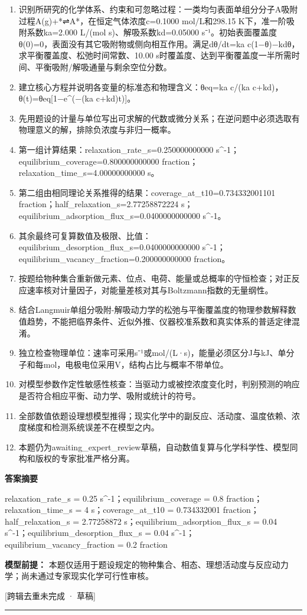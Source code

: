 \documentclass[UTF8,11pt,a4paper]{ctexart}
\begin{document}
\begin{enumerate}
\item 识别所研究的化学体系、约束和可忽略过程：一类均匀表面单组分分子A吸附过程A(g)+*⇌A*，在恒定气体浓度c=0.1000 mol/L和298.15 K下，准一阶吸附系数ka=2.000 L/(mol s)、解吸系数kd=0.05000 s⁻¹。初始表面覆盖度θ(0)=0，表面没有其它吸附物或侧向相互作用。满足dθ/dt=ka c(1−θ)−kdθ，求平衡覆盖度、松弛时间常数、10.00 s时覆盖度、达到平衡覆盖度一半所需时间、平衡吸附/解吸通量与剩余空位分数。
\item 建立核心方程并说明各变量的标准态和物理含义：θeq=ka c/(ka c+kd)，θ(t)=θeq[1−e\textasciicircum{}(−(ka c+kd)t)]。
\item 先用题设的计量与单位写出可求解的代数或微分关系；在逆问题中必须选取有物理意义的解，排除负浓度与非归一概率。
\item 第一组计算结果：relaxation\_rate\_s=0.250000000000 s\textasciicircum{}-1；equilibrium\_coverage=0.800000000000 fraction；relaxation\_time\_s=4.00000000000 s。
\item 第二组由相同理论关系推得的结果：coverage\_at\_t10=0.734332001101 fraction；half\_relaxation\_s=2.77258872224 s；equilibrium\_adsorption\_flux\_s=0.0400000000000 s\textasciicircum{}-1。
\item 其余最终可复算数值及极限、比值：equilibrium\_desorption\_flux\_s=0.0400000000000 s\textasciicircum{}-1；equilibrium\_vacancy\_fraction=0.200000000000 fraction。
\item 按题给物种集合重新做元素、位点、电荷、能量或总概率的守恒检查；对正反应速率核对计量因子，对能量差核对其与Boltzmann指数的无量纲性。
\item 结合Langmuir单组分吸附-解吸动力学的松弛与平衡覆盖度的物理参数解释数值趋势，不能把临界条件、近似外推、仪器校准系数和真实体系的普适定律混淆。
\item 独立检查物理单位：速率可采用s⁻¹或mol/(L·s)，能量必须区分J与kJ、单分子和每mol，电极电位采用V，结构占比与概率不带单位。
\item 对模型参数作定性敏感性核查：当驱动力或被控浓度变化时，判别预测的响应是否符合相应平衡、动力学、吸附或统计的符号。
\item 全部数值依题设理想模型推得；现实化学中的副反应、活动度、温度依赖、浓度梯度和检测系统误差不在模型之内。
\item 本题仍为awaiting\_expert\_review草稿，自动数值复算与化学科学性、模型同构和版权的专家批准严格分离。
\end{enumerate}
\noindent\textbf{答案摘要}\par
relaxation\_rate\_s = 0.25 s\textasciicircum{}-1；equilibrium\_coverage = 0.8 fraction；relaxation\_time\_s = 4 s；coverage\_at\_t10 = 0.734332001 fraction；half\_relaxation\_s = 2.77258872 s；equilibrium\_adsorption\_flux\_s = 0.04 s\textasciicircum{}-1；equilibrium\_desorption\_flux\_s = 0.04 s\textasciicircum{}-1；equilibrium\_vacancy\_fraction = 0.2 fraction\par
\noindent\textbf{模型前提：}
本题仅适用于题设规定的物种集合、相态、理想活动度与反应动力学；尚未通过专家现实化学可行性审核。\par
\noindent\textcolor{red!65!black}{[跨辑去重未完成 · 草稿]} \par
\medskip\hrule\medskip
{}
\end{document}
